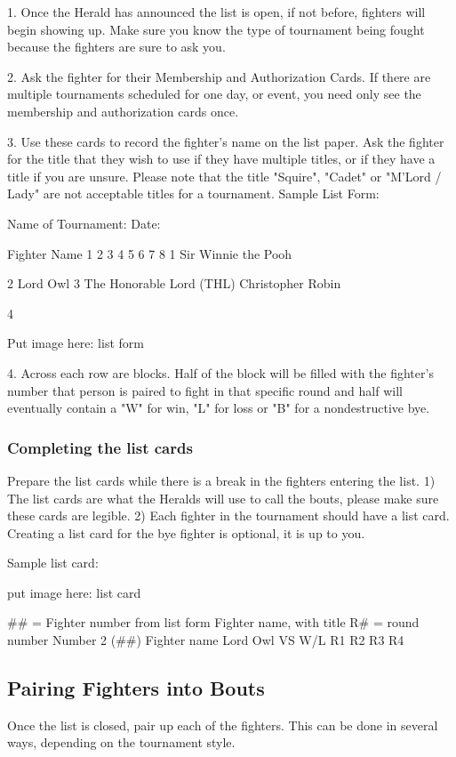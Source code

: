 \documentclass{article}
\begin{document}
1. Once the Herald has announced the list is open, if not before, fighters will begin showing up. Make
sure you know the type of tournament being fought because the fighters are sure to ask you.

2. Ask the fighter for their Membership and Authorization Cards. If there are multiple tournaments
scheduled for one day, or event, you need only see the membership and authorization cards once.

3. Use these cards to record the fighter’s name on the list paper. Ask the fighter for the title that they
wish to use if they have multiple titles, or if they have a title if you are unsure. Please note that the title
"Squire", "Cadet" or "M’Lord / Lady" are not acceptable titles for a tournament.
Sample List Form:

Name of Tournament: Date:

Fighter Name 1 2 3 4 5 6 7 8
1 Sir Winnie the Pooh

2 Lord Owl
3
The Honorable Lord (THL)
Christopher Robin

4

Put image here: list form


4. Across each row are blocks. Half of the block will be filled with the fighter’s number that person is
paired to fight in that specific round and half will eventually contain a "W" for win, "L" for loss or
"B" for a nondestructive bye.


\subsubsection{Completing the list cards}

Prepare the list cards while there is a break in the fighters entering the list.
1) The list cards are what the Heralds will use to call the bouts, please make sure these cards are legible.
2) Each fighter in the tournament should have a list card. Creating a list card for the bye fighter is
optional, it is up to you.

Sample list card:

put image here: list card

\#\# = Fighter number from list form
Fighter name, with title
R\# = round number
Number 2 (\#\#)
Fighter name
Lord Owl
VS W/L
R1
R2
R3
R4


\subsection{Pairing Fighters into Bouts}
Once the list is closed, pair up each of the fighters. This can be done in several ways, depending on the
tournament style.
\end{document}
